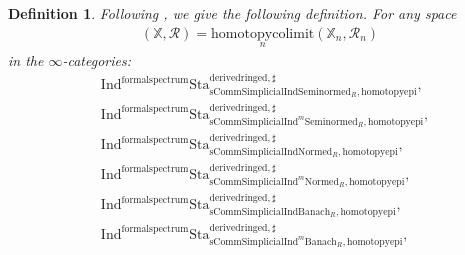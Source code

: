 \documentclass[12pt]{book}
\newtheorem{definition}{Definition}
\begin{document}
  

\begin{definition}
Following \cite[Definition 9.3.3, Definition 9.3.5, Definition 9.3.11, Definition 9.3.9]{KL1}, \cite{KL2} we give the following definition. For any space
\begin{align}
(\mathbb{X},\mathcal{R})=\underset{n}{\mathrm{homotopycolimit}}(\mathbb{X}_n,\mathcal{R}_n)	
\end{align}
in the $\infty$-categories:
\begin{align}
&\mathrm{Ind}^\mathrm{formalspectrum}\mathrm{Sta}^\mathrm{derivedringed,\sharp}_{\mathrm{sComm}\mathrm{Simplicial}\mathrm{Ind}\mathrm{Seminormed}_R,\mathrm{homotopyepi}},\\
&\mathrm{Ind}^\mathrm{formalspectrum}\mathrm{Sta}^\mathrm{derivedringed,\sharp}_{\mathrm{sComm}\mathrm{Simplicial}\mathrm{Ind}^m\mathrm{Seminormed}_R,\mathrm{homotopyepi}},\\
&\mathrm{Ind}^\mathrm{formalspectrum}\mathrm{Sta}^\mathrm{derivedringed,\sharp}_{\mathrm{sComm}\mathrm{Simplicial}\mathrm{Ind}\mathrm{Normed}_R,\mathrm{homotopyepi}},\\
&\mathrm{Ind}^\mathrm{formalspectrum}\mathrm{Sta}^\mathrm{derivedringed,\sharp}_{\mathrm{sComm}\mathrm{Simplicial}\mathrm{Ind}^m\mathrm{Normed}_R,\mathrm{homotopyepi}},\\
&\mathrm{Ind}^\mathrm{formalspectrum}\mathrm{Sta}^\mathrm{derivedringed,\sharp}_{\mathrm{sComm}\mathrm{Simplicial}\mathrm{Ind}\mathrm{Banach}_R,\mathrm{homotopyepi}},\\
&\mathrm{Ind}^\mathrm{formalspectrum}\mathrm{Sta}^\mathrm{derivedringed,\sharp}_{\mathrm{sComm}\mathrm{Simplicial}\mathrm{Ind}^m\mathrm{Banach}_R,\mathrm{homotopyepi}},	
\end{align}


\end{definition}
\end{document}
